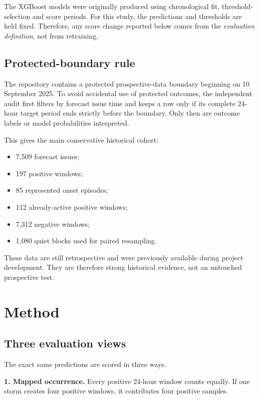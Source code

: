 \documentclass[11pt]{article}
\begin{document}
The XGBoost models were originally produced using chronological fit, threshold-selection and score periods. For this study, the predictions and thresholds are held fixed. Therefore, any score change reported below comes from the \emph{evaluation definition}, not from retraining.

\subsection{Protected-boundary rule}

The repository contains a protected prospective-data boundary beginning on 10 September 2025. To avoid accidental use of protected outcomes, the independent audit first filters by forecast issue time and keeps a row only if its complete 24-hour target period ends strictly before the boundary. Only then are outcome labels or model probabilities interpreted.

This gives the main conservative historical cohort:

\begin{itemize}
    \item 7,509 forecast issues;
    \item 197 positive windows;
    \item 85 represented onset episodes;
    \item 112 already-active positive windows;
    \item 7,312 negative windows;
    \item 1,080 quiet blocks used for paired resampling.
\end{itemize}

These data are still retrospective and were previously available during project development. They are therefore strong historical evidence, not an untouched prospective test.

\section{Method}

\subsection{Three evaluation views}

The exact same predictions are scored in three ways.

\textbf{1. Mapped occurrence.} Every positive 24-hour window counts equally. If one storm creates four positive windows, it contributes four positive samples.
\end{document}
